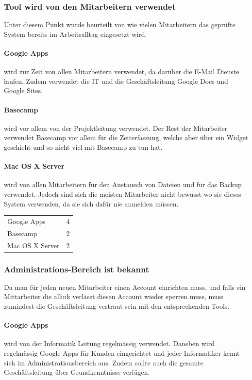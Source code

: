 \subsubsection{Tool wird von den Mitarbeitern verwendet}
\label{ssub:Tool wird von den Mitarbeitern verwendet}
Unter diesem Punkt wurde beurteilt von wie vielen Mitarbeitern das geprüfte System bereits im Arbeitsalltag eingesetzt wird.
\paragraph{Google Apps}
\label{par:1.2Google Apps}
wird zur Zeit von allen Mitarbeitern verwendet, da darüber die E-Mail Dienste laufen. Zudem verwendet die IT und die Geschäftsleitung Google Docs und Google Sites.
\paragraph{Basecamp}
\label{par:1.2Basecamp}
wird vor allem von der Projektleitung verwendet. Der Rest der Mitarbeiter verwendet Basecamp vor allem für die Zeiterfassung, welche aber über ein Widget geschieht und so nicht viel mit Basecamp zu tun hat.
\paragraph{Mac OS X Server}
\label{par:1.2Mac OS X Server}
wird von allen Mitarbeitern für den Austausch von Dateien und für das Backup verwendet. Jedoch sind sich die meisten Mitarbeiter nicht bewusst wo sie dieses System verwenden, da sie sich dafür nie anmelden müssen.

\begin{tabular}{lc}
Google Apps & 4\\
Basecamp & 2\\
Mac OS X Server & 2\\
\end{tabular}

\subsubsection{Administrations-Bereich ist bekannt}
\label{ssub:Adminbereich ist bekannt}
Da man für jeden neuen Mitarbeiter einen Account einrichten muss, und falls ein Mittarbeiter die allink verlässt diesen Account wieder sperren muss, muss zumindest die Geschäftsleitung vertraut sein mit den entsprechenden Tools.
\paragraph{Google Apps}
\label{par:1.3Google Apps}
wird von der Informatik Leitung regelmässig verwendet. Daneben wird regelmässig Google Apps für Kunden eingerichtet und jeder Informatiker kennt sich im Administrationsbereich aus. Zudem sollte auch die gesamte Geschäftsleitung über Grundkenntnisse verfügen.
